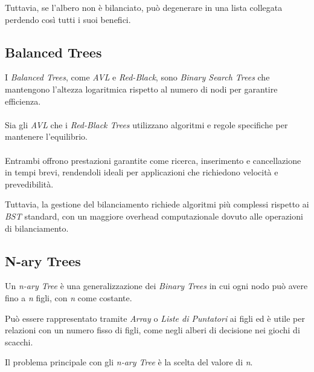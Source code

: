 \documentclass[12pt,a4paper,openright,twoside]{book}
\begin{document}
            Tuttavia, se l'albero non è bilanciato, può degenerare in una lista collegata perdendo così tutti i suoi benefici.

        \subsection{Balanced Trees}
            I \textit{Balanced Trees}, come \textit{AVL} e \textit{Red-Black}, sono \textit{Binary Search Trees} che mantengono l'altezza logaritmica rispetto al numero di nodi per garantire efficienza.

            \paragraph*{}

            Sia gli \textit{AVL} che i \textit{Red-Black Trees} utilizzano algoritmi e regole specifiche per mantenere l'equilibrio.

            \paragraph*{}

            Entrambi offrono prestazioni garantite come ricerca, inserimento e cancellazione in tempi brevi, rendendoli ideali per applicazioni che richiedono velocità e prevedibilità.

            Tuttavia, la gestione del bilanciamento richiede algoritmi più complessi rispetto ai \textit{BST} standard, con un maggiore overhead computazionale dovuto alle operazioni di bilanciamento.

        \subsection{N-ary Trees}

            Un \textit{n-ary Tree} è una generalizzazione dei \textit{Binary Trees} in cui ogni nodo può avere fino a \textit{n} figli, con \textit{n} come costante.

            Può essere rappresentato tramite \textit{Array} o \textit{Liste di Puntatori} ai figli ed è utile per relazioni con un numero fisso di figli, come negli alberi di decisione nei giochi di scacchi.

            \pagebreak

            Il problema principale con gli \textit{n-ary Tree} è la scelta del valore di \textit{n}.
\end{document}
